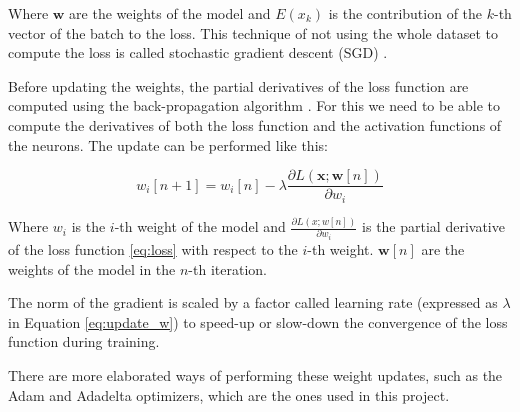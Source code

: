 Where $\mathbf{w}$ are the weights of the model and $E(x_k)$ is the contribution of the $k$-th vector of the batch to the loss. This technique of not using the whole dataset to compute the loss is called stochastic gradient descent (SGD) \cite{bottou2010large}.

Before updating the weights, the partial derivatives of the loss function are computed using the back-propagation algorithm \cite{chauvin1995backpropagation}. For this we need to be able to compute the derivatives of both the loss function and the activation functions of the neurons. The update can be performed like this:

\begin{equation}
    w_i[n+1] = w_i[n] - \lambda \frac{\partial L(\mathbf{x}; \mathbf{w}[n])}{\partial w_i}
    \label{eq:update_w}
\end{equation}

Where $w_i$ is the $i$-th weight of the model and $\frac{\partial L(x; w[n])}{\partial w_i}$ is the partial derivative of the loss function \eqref{eq:loss} with respect to the $i$-th weight. $\mathbf{w}[n]$ are the weights of the model in the $n$-th iteration.

The norm of the gradient is scaled by a factor called learning rate (expressed as $\lambda$ in Equation \eqref{eq:update_w}) to speed-up or slow-down the convergence of the loss function during training.

There are more elaborated ways of performing these weight updates, such as the Adam \cite{kingma2014adam} and Adadelta \cite{zeiler2012adadelta} optimizers, which are the ones used in this project.




